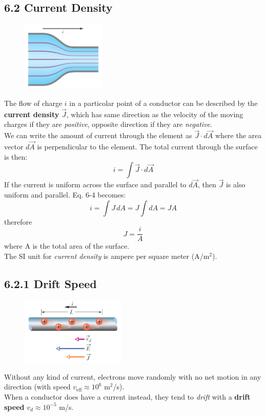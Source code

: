 \documentclass[12pt, a4paper]{article}
\begin{document}
		
		
		\newpage
		
		\subsection*{6.2 Current Density}
		
		\begin{figure}
			\centering
			\includegraphics[width=4cm]{Physics2_PNGs/curr-density.png}
			\caption*{}
			\label{fig:curr-density.png}
		\end{figure}
		The flow of charge $i$ in a particolar point of a conductor can be described by the \textbf{current density} $\vec{J}$, which has same direction as the velocity of the moving charges if they are \textit{positive}, opposite direction if they are \textit{negative}. \\
		We can write the amount of current through the element as 
		$\vec{J} \cdot d\vec{A}$ where the area vector $d\vec{A}$ is perpendicular to the element. The total current through the surface is then:
		\begin{equation*}
			i = \int \vec{J} \cdot d\vec{A}
			\tag{6-4}
		\end{equation*}
		If the current is uniform across the surface and parallel to $d\vec{A}$, then $\vec{J}$ is also uniform and parallel. Eq. 6-4 becomes:
		\[
			i = \int J \, dA = J \int dA = JA
		\]
		therefore
		\[
			J = \frac{i}{A}
			\tag{6-5}
		\]
		where A is the total area of the surface. \\
		The SI unit for \textit{current density} is ampere per square meter (A/m$^2$).
		
		
		
		\subsection*{6.2.1 Drift Speed}
		
		\begin{figure}
			\centering
			\includegraphics[width=5cm]{Physics2_PNGs/drift-speed.png}
			\caption*{}
			\label{fig:drift-speed.png}
		\end{figure}
		Without any kind of current, electrons move randomly with no net motion in any direction (with speed $v_{\text{eff}} \approx 10^6$ m$^2$/s). \\
		When a conductor does have a current instead, they tend to \textit{drift} with a \textbf{drift speed} $v_d \approx 10^{-5}$ m/s. \\
		
\end{document}
